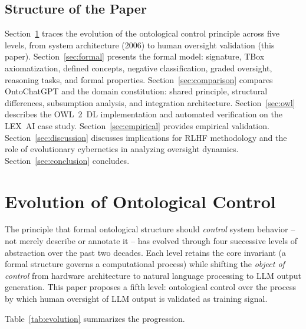 \documentclass[11pt]{article}
\begin{document}
\subsection{Structure of the Paper}
\label{sec:structure}

Section~\ref{sec:evolution} traces the evolution of the ontological control principle across five levels, from system architecture (2006) to human oversight validation (this paper).
Section~\ref{sec:formal} presents the formal model: signature, TBox axiomatization, defined concepts, negative classification, graded oversight, reasoning tasks, and formal properties.
Section~\ref{sec:comparison} compares OntoChatGPT and the domain constitution: shared principle, structural differences, subsumption analysis, and integration architecture.
Section~\ref{sec:owl} describes the OWL~2~DL implementation and automated verification on the LEX~AI case study.
Section~\ref{sec:empirical} provides empirical validation.
Section~\ref{sec:discussion} discusses implications for RLHF methodology and the role of evolutionary cybernetics in analyzing oversight dynamics.
Section~\ref{sec:conclusion} concludes.


\section{Evolution of Ontological Control}
\label{sec:evolution}

The principle that formal ontological structure should \emph{control} system behavior -- not merely describe or annotate it -- has evolved through four successive levels of abstraction over the past two decades.
Each level retains the core invariant (a formal structure governs a computational process) while shifting the \emph{object of control} from hardware architecture to natural language processing to LLM output generation.
This paper proposes a fifth level: ontological control over the process by which human oversight of LLM output is validated as training signal.

Table~\ref{tab:evolution} summarizes the progression.
\end{document}

